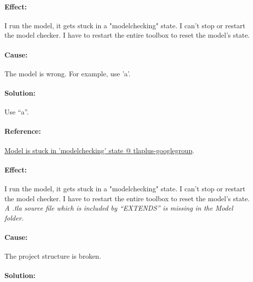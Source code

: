\paragraph{Effect:}
I run the model, it gets stuck in a "modelchecking" state. 
I can't stop or restart the model checker. 
I have to restart the entire toolbox to reset the model's state.

\paragraph{Cause:}
The model is wrong.
For example, use 'a'. 

\paragraph{Solution:}
Use ``a''.

\paragraph{Reference:}
\href{https://github.com/tlaplus/tlaplus/issues/143}{Model is stuck in 'modelchecking' state @ tlaplus-googlegroup}.

\paragraph{Effect:}
I run the model, it gets stuck in a "modelchecking" state. 
I can't stop or restart the model checker. 
I have to restart the entire toolbox to reset the model's state.
{\it A .tla source file which is included by ``EXTENDS'' is missing in the Model folder.}

\paragraph{Cause:}
The project structure is broken.

\paragraph{Solution:}
